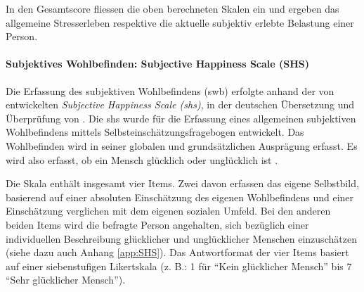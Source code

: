 In den Gesamtscore fliessen die oben berechneten Skalen ein und ergeben das allgemeine Stresserleben respektive die aktuelle subjektiv erlebte Belastung einer Person.

\paragraph{Subjektives Wohlbefinden: Subjective Happiness Scale (SHS)}\label{sec:SWB}
Die Erfassung des subjektiven Wohlbefindens (\acrshort{swb}) erfolgte anhand der von  entwickelten \textit{Subjective Happiness Scale (\acrshort{shs})}, in der deutschen Übersetzung und Überprüfung von . Die \acrshort{shs} wurde für die Erfassung  eines allgemeinen subjektiven Wohlbefindens mittels Selbsteinschätzungsfragebogen entwickelt. Das Wohlbefinden wird in seiner globalen und grundsätzlichen Ausprägung erfasst. Es wird also erfasst, ob ein Mensch glücklich oder unglücklich ist \cite[S.~139 ff.]{Lyubomirsky1999}.

Die Skala enthält insgesamt vier Items. Zwei davon erfassen das eigene Selbstbild, basierend auf einer absoluten Einschätzung des eigenen Wohlbefindens und einer Einschätzung verglichen mit dem eigenen sozialen Umfeld. Bei den anderen beiden Items wird die befragte Person angehalten, sich bezüglich einer individuellen Beschreibung glücklicher und unglücklicher Menschen einzuschätzen (siehe dazu auch Anhang \ref{app:SHS}). Das Antwortformat der vier Items basiert auf einer siebenstufigen Likert\-skala (z. B.: 1 für \enquote{Kein glücklicher Mensch} bis 7 \enquote{Sehr glücklicher Mensch}). 


